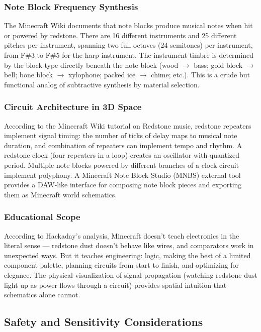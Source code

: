 \documentclass[11pt,letterpaper]{article}
\begin{document}
\subsubsection{Note Block Frequency Synthesis}

The Minecraft Wiki documents that note blocks produce musical notes when hit or powered by redstone. There are 16 different instruments and 25 different pitches per instrument, spanning two full octaves (24 semitones) per instrument, from F\#3 to F\#5 for the harp instrument. The instrument timbre is determined by the block type directly beneath the note block (wood $\to$ bass; gold block $\to$ bell; bone block $\to$ xylophone; packed ice $\to$ chime; etc.). This is a crude but functional analog of subtractive synthesis by material selection.

\subsubsection{Circuit Architecture in 3D Space}

According to the Minecraft Wiki tutorial on Redstone music, redstone repeaters implement signal timing: the number of ticks of delay maps to musical note duration, and combination of repeaters can implement tempo and rhythm. A redstone clock (four repeaters in a loop) creates an oscillator with quantized period. Multiple note blocks powered by different branches of a clock circuit implement polyphony. A Minecraft Note Block Studio (MNBS) external tool provides a DAW-like interface for composing note block pieces and exporting them as Minecraft world schematics.

\subsubsection{Educational Scope}

According to Hackaday's analysis, Minecraft doesn't teach electronics in the literal sense --- redstone dust doesn't behave like wires, and comparators work in unexpected ways. But it teaches engineering: logic, making the best of a limited component palette, planning circuits from start to finish, and optimizing for elegance. The physical visualization of signal propagation (watching redstone dust light up as power flows through a circuit) provides spatial intuition that schematics alone cannot.

\subsection{Safety and Sensitivity Considerations}
\end{document}
